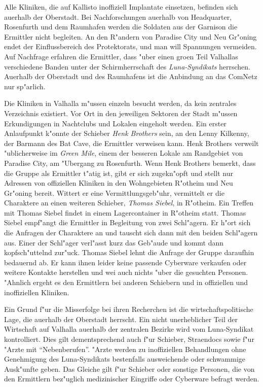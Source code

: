 Alle Kliniken, die auf Kallisto inoffiziell Implantate einsetzen, befinden sich au\3erhalb der Oberstadt. Bei Nachforschungen au\3erhalb von Headquarter, Rosenfurth und dem Raumhafen werden die Soldaten aus der Garnison die Ermittler nicht begleiten. An den R"andern von Paradise City und Neu Gr"oning endet der Einflussbereich des Protektorats, und man will Spannungen vermeiden. Auf Nachfrage erfahren die Ermittler, dass "uber einen gro\3en Teil Valhallas verschiedene Banden unter der Schirmherrschaft des \emph{Luna-Syndikats} herrschen. Au\3erhalb der Oberstadt und des Raumhafens ist die Anbindung an das ComNetz nur sp"arlich.

Die Kliniken in Valhalla m"ussen einzeln besucht werden, da kein zentrales Verzeichnis existiert. Vor Ort in den jeweiligen Sektoren der Stadt m"ussen Erkundigungen in Nachtclubs und Lokalen eingeholt werden. Ein erster Anlaufpunkt k"onnte der Schieber \emph{Henk Brothers} sein, an den Lenny Kilkenny, der Barmann des Bat Cave, die Ermittler verweisen kann. Henk Brothers verweilt "ublicherweise im \emph{Green Mile}, einem der besseren Lokale am Randgebiet von Paradise City, am "Ubergang zu Rosenfurth. Wenn Henk Brothers bemerkt, dass die Gruppe als Ermittler t"atig ist, gibt er sich zugekn"opft und stellt nur Adressen von offiziellen Kliniken in den Wohngebieten R"otheim und Neu Gr"oning bereit. Wittert er eine Vermittlungsgeb"uhr, vermittelt er die Charaktere an einen weiteren Schieber, \emph{Thomas Siebel}, in R"otheim. Ein Treffen mit Thomas Siebel findet in einem Lagercontainer in R"otheim statt. Thomas Siebel empf"angt die Ermittler in Begleitung von zwei Schl"agern. Er h"ort sich die Anfragen der Charaktere an und tauscht sich dann mit den beiden Schl"agern aus. Einer der Schl"ager verl"asst kurz das Geb"aude und kommt dann kopfsch"uttelnd zur"uck. Thomas Siebel lehnt die Anfrage der Gruppe daraufhin bedauernd ab. Er kann ihnen leider keine passende Cyberware verkaufen oder weitere Kontakte herstellen und wei\3 auch nichts "uber die gesuchten Personen. "Ahnlich ergeht es den Ermittlern bei anderen Schiebern und in offiziellen und inoffiziellen Kliniken.

Ein Grund f"ur die Misserfolge bei ihren Recherchen ist die wirtschaftspolitische Lage, die au\3erhalb der Oberstadt herrscht. Ein nicht unerheblicher Teil der Wirtschaft auf Valhalla au\3erhalb der zentralen Bezirke wird vom Luna-Syndikat kontrolliert. Dies gilt dementsprechend auch f"ur Schieber, Stra\3endocs sowie f"ur "Arzte mit "`Nebenberufen"'. "Arzte werden zu inoffiziellen Behandlungen ohne Genehmigung des Luna-Syndikats bestenfalls ausweichende oder schwammige Ausk"unfte geben. Das Gleiche gilt f"ur Schieber oder sonstige Personen, die von den Ermittlern bez"uglich medizinischer Eingriffe oder Cyberware befragt werden.

